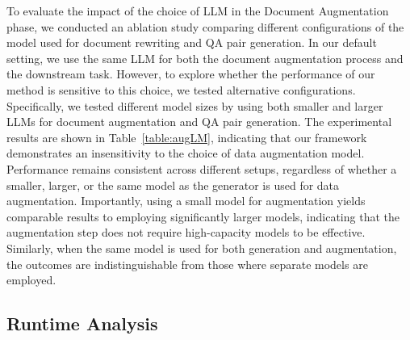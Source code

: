 \documentclass[sigconf,natbib=true,anonymous=false]{acmart}
\begin{document}

To evaluate the impact of the choice of LLM in the Document Augmentation phase, we conducted an ablation study comparing different configurations of the model used for document rewriting and QA pair generation. In our default setting, we use the same LLM for both the document augmentation process and the downstream task. However, to explore whether the performance of our method is sensitive to this choice, we tested alternative configurations. 
Specifically, we tested different model sizes by using both smaller and larger LLMs for document augmentation and QA pair generation.
The experimental results are shown in Table~\ref{table:augLM}, indicating that our framework demonstrates an insensitivity to the choice of data augmentation model. 
Performance remains consistent across different setups, regardless of whether a smaller, larger, or the same model as the generator is used for data augmentation. Importantly, using a small model for augmentation yields comparable results to employing significantly larger models, indicating that the augmentation step does not require high-capacity models to be effective. Similarly, when the same model is used for both generation and augmentation, the outcomes are indistinguishable from those where separate models are employed.




\subsection{Runtime Analysis}
\end{document}
